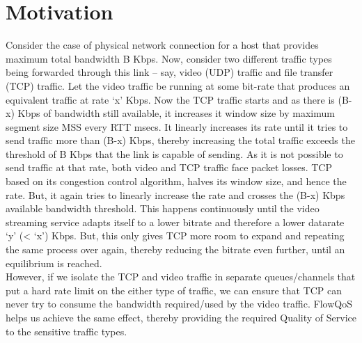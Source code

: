 \section{Motivation}
\label{sec:motivation}

Consider the case of physical network connection for a host that provides maximum total bandwidth B Kbps. Now, consider two different traffic types being forwarded through this link – say, video (UDP) traffic and file transfer (TCP) traffic. Let the video traffic be running at some bit-rate that produces an equivalent traffic at rate ‘x’ Kbps. Now the TCP traffic starts and as there is (B-x) Kbps of bandwidth still available, it increases it window size by maximum segment size MSS every RTT msecs. It linearly increases its rate until it tries to send traffic more than (B-x) Kbps, thereby increasing the total traffic exceeds the threshold of B Kbps that the link is capable of sending. As it is not possible to send traffic at that rate, both video and TCP traffic face packet losses. TCP based on its congestion control algorithm, halves its window size, and hence the rate. But, it again tries to linearly increase the rate and crosses the (B-x) Kbps available bandwidth threshold. This happens continuously until the video streaming service adapts itself to a lower bitrate and therefore a lower datarate ‘y’ (< ‘x’) Kbps. But, this only gives TCP more room to expand and repeating the same process over again, thereby reducing the bitrate even further, until an equilibrium is reached.\\

However, if we isolate the TCP and video traffic in separate queues/channels that put a hard rate limit on the either type of traffic, we can ensure that TCP can never try to consume the bandwidth required/used by the video traffic. FlowQoS helps us achieve the same effect, thereby providing the required Quality of Service to the sensitive traffic types.\\